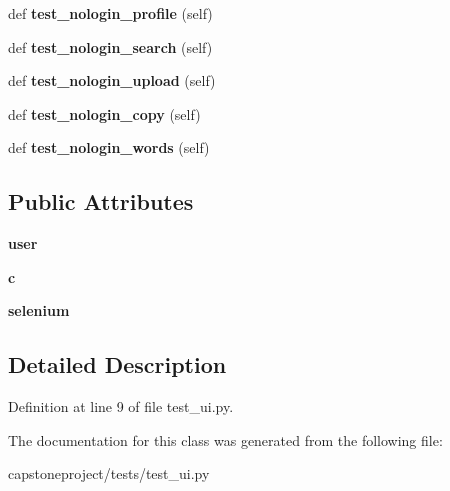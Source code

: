 \begin{DoxyCompactItemize}
def {\bfseries test\+\_\+nologin\+\_\+profile} (self)
\item 
\mbox{\label{classcapstoneproject_1_1tests_1_1test__ui_1_1_test_u_i_a1ee6211efbc7c6e4ef8f10d268ac2977}} 
def {\bfseries test\+\_\+nologin\+\_\+search} (self)
\item 
\mbox{\label{classcapstoneproject_1_1tests_1_1test__ui_1_1_test_u_i_aac65c32c85471e1c21d4e0d97bf652b7}} 
def {\bfseries test\+\_\+nologin\+\_\+upload} (self)
\item 
\mbox{\label{classcapstoneproject_1_1tests_1_1test__ui_1_1_test_u_i_a456f7763664d804d7cda493ff861db9e}} 
def {\bfseries test\+\_\+nologin\+\_\+copy} (self)
\item 
\mbox{\label{classcapstoneproject_1_1tests_1_1test__ui_1_1_test_u_i_a6c9322bb475efaa68c0448859fb3d590}} 
def {\bfseries test\+\_\+nologin\+\_\+words} (self)
\end{DoxyCompactItemize}
\subsection*{Public Attributes}
\begin{DoxyCompactItemize}
\item 
\mbox{\label{classcapstoneproject_1_1tests_1_1test__ui_1_1_test_u_i_abfbd0cabecd1de80b213be5b0c9ecfef}} 
{\bfseries user}
\item 
\mbox{\label{classcapstoneproject_1_1tests_1_1test__ui_1_1_test_u_i_a62178b66b8218885f7cf31ef04b84544}} 
{\bfseries c}
\item 
\mbox{\label{classcapstoneproject_1_1tests_1_1test__ui_1_1_test_u_i_a158c7394fc01d7e267a0c8a3b4260daa}} 
{\bfseries selenium}
\end{DoxyCompactItemize}


\subsection{Detailed Description}


Definition at line 9 of file test\+\_\+ui.\+py.



The documentation for this class was generated from the following file\+:\begin{DoxyCompactItemize}
\item 
capstoneproject/tests/test\+\_\+ui.\+py\end{DoxyCompactItemize}
